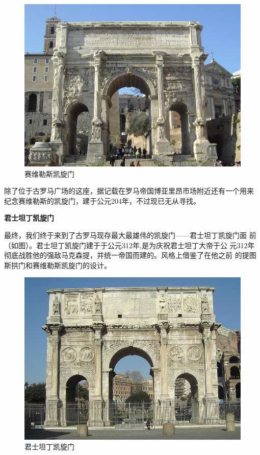 \documentclass[a4paper,dvipdfm]{article}
\begin{document}
\begin{figure}[hbt!]
  \centering
  \includegraphics[width=\textwidth]{ArchofSeptimiusSeverus}
  \caption{赛维勒斯凯旋门}
  \label{fig:serverus}
\end{figure}

除了位于古罗马广场的这座，据记载在罗马帝国博亚里昂市场附近还有一个用来
纪念赛维勒斯的凯旋门，建于公元204年，不过现已无从寻找。


\textbf{君士坦丁凯旋门}

最终，我们终于来到了古罗马现存最大最雄伟的凯旋门——君士坦丁凯旋门面
前（如图）。君士坦丁凯旋门建于于公元312年,是为庆祝君士坦丁大帝于公
元312年彻底战胜他的强敌马克森提，并统一帝国而建的。风格上借鉴了在他之前
的提图斯拱门和赛维勒斯凯旋门的设计。

\begin{figure}[hbt!]
  \centering
  \includegraphics[width=\textwidth]{ConstantineArch}
  \caption{君士坦丁凯旋门}
  \label{fig:contiantine}
\end{figure}
\end{document}
